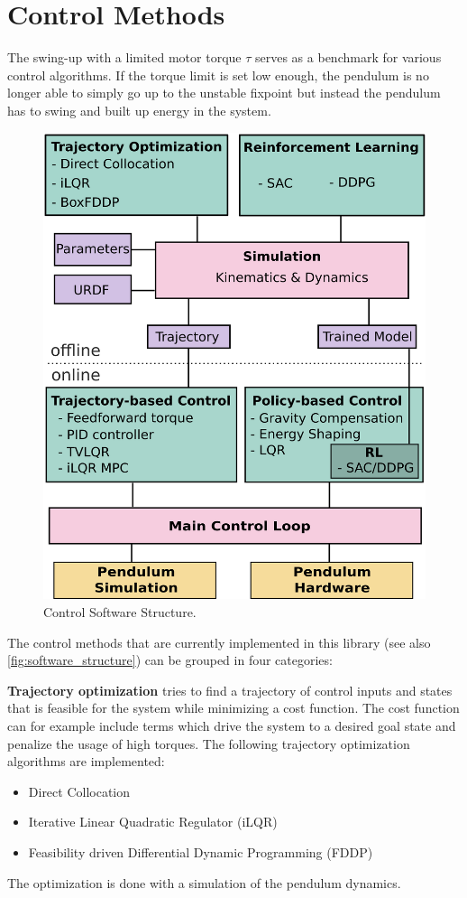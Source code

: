 \documentclass[onecolumn, letter paper]{report}
\begin{document}
\chapter{Control Methods}
The swing-up with a limited motor torque $\tau$ serves as a benchmark for various control algorithms. If the torque limit is set low enough, the pendulum is no longer able to simply go up to the unstable fixpoint but instead the pendulum has to swing and built up energy in the system.

\begin{figure}[H]
    \centering
    \includegraphics[width=0.4\linewidth]{figures/controller_overview.png}
    \caption{Control Software Structure.}
    \label{fig:software_structure}
\end{figure}

The control methods that are currently implemented in this library (see also \autoref{fig:software_structure}) can be grouped in four categories:

\textbf{Trajectory optimization} tries to find a trajectory of control inputs and states that is feasible for the system while minimizing a cost function. The cost function can for example include terms which drive the system to a desired goal state and penalize the usage of high torques. The following trajectory optimization algorithms are implemented:

\begin{itemize}
    \item Direct Collocation \autocite{hargraves1987direct}
    \item Iterative Linear Quadratic Regulator (iLQR) \autocite{weiwei2004iterative}
    \item Feasibility driven Differential Dynamic Programming (FDDP) \autocite{mastalli2020crocoddyl}
\end{itemize}

The optimization is done with a simulation of the pendulum dynamics.
\end{document}
